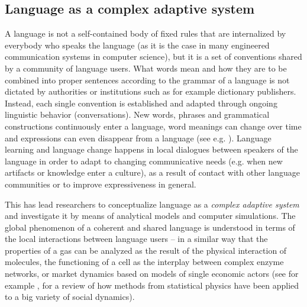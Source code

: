 \subsection{Language as a complex adaptive system}
\label{s:language-as-a-complex-adaptive-system}

A language is not a self-contained body of fixed rules that are
internalized by everybody who speaks the language (as it is the case
in many engineered communication systems in computer science), but it
is a set of conventions shared by a community of language users. What
words mean and how they are to be combined into proper sentences
according to the grammar of a language is not dictated by authorities
or institutions such as for example dictionary publishers. Instead,
each single convention is established and adapted through ongoing
linguistic behavior (conversations). New words, phrases and
grammatical constructions continuously enter a language, word meanings
can change over time and expressions can even disappear from a
language (see
e.g. \citealp{croft00explaining,deutscher05unfolding}). Language
learning and language change happens in local dialogues between
speakers of the language in order to adapt to changing communicative
needs (e.g. when new artifacts or knowledge enter a culture), as a
result of contact with other language communities or to improve
expressiveness in general.

This has lead researchers to conceptualize language as a \emph{complex
  adaptive system} \citep{steels00language} and investigate it by
means of analytical models and computer simulations. The global
phenomenon of a coherent and shared language is understood in terms of
the local interactions between language users -- in a similar way that
the properties of a gas can be analyzed as the result of the physical
interaction of molecules, the functioning of a cell as the interplay
between complex enzyme networks, or market dynamics based on models of
single economic actors (see for example
\citealp*{castellano09statistical}, for a review of how methods from
statistical physics have been applied to a big variety of social
dynamics).

